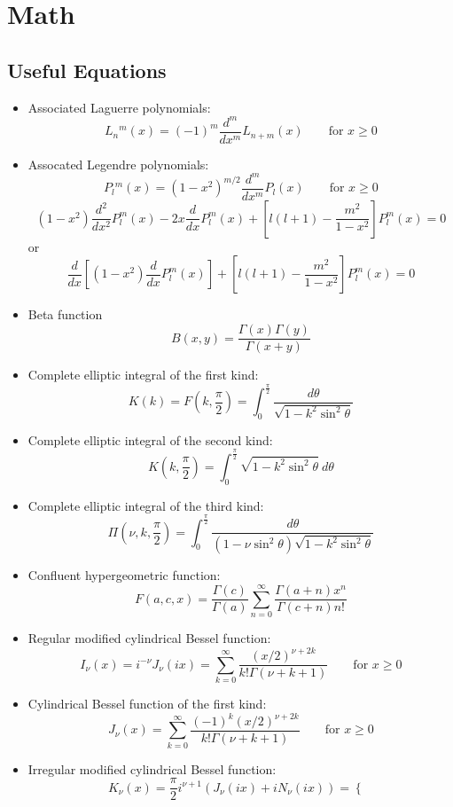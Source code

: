 \chapter{Math}

\section{Useful Equations}
\begin{itemize}
    \item Associated Laguerre polynomials:
	$$ L_n{}^m(x) = (-1)^m\frac{d^m}{dx^m}L_{n+m}(x) \qquad \text{for } x \ge 0$$
    \item Assocated Legendre polynomials:
	$$ P_l{}^m(x) = (1-x^2)^{m/2}\frac{d^m}{dx^m}P_{l}(x) \qquad \text{for } x \ge 0$$
	$$ (1-x^2)\frac{d^2}{dx^2}P_l^m(x) - 2x\frac{d}{dx}P_l^m(x) + 
	\left[ l(l+1) - \frac{m^2}{1-x^2} \right] P_l^m(x) = 0 $$
	or
	$$ \frac{d}{dx}\left[(1-x^2)\frac{d}{dx}P_l^m(x) \right] + 
	\left[ l(l+1) - \frac{m^2}{1-x^2} \right] P_l^m(x) = 0 $$
    \item Beta function
	$$ B(x,y) = \frac{\Gamma(x)\Gamma(y)}{\Gamma(x+y)} $$
    \item Complete elliptic integral of the first kind:
	$$ K(k) = F(k,\frac{\pi}{2}) = \int_0^{\frac{\pi}{2}}\frac{d\theta}{\sqrt{1-k^2\sin^2\theta}}$$
    \item Complete elliptic integral of the second kind:
	$$ K(k,\frac{\pi}{2}) = \int_0^{\frac{\pi}{2}}\sqrt{1-k^2\sin^2\theta}\ d\theta$$
    \item Complete elliptic integral of the third kind:
	$$ \Pi(\nu,k,\frac{\pi}{2}) = \int_0^{\frac{\pi}{2}}\frac{d\theta}{(1-\nu\sin^2\theta)\sqrt{1-k^2\sin^2\theta}}$$
    \item Confluent hypergeometric function:
	$$ F(a,c,x)= \frac{\Gamma(c)}{\Gamma(a)}\sum_{n=0}^\infty\frac{\Gamma(a+n)x^n}{\Gamma(c+n)n!}$$
    \item Regular modified cylindrical Bessel function:
	$$ I_\nu(x) = i^{-\nu} J_\nu(ix) = \sum_{k=0}^{\infty}\frac{(x/2)^{\nu+2k}}{k!\Gamma(\nu+k+1)} \qquad \text{for } x \ge 0$$
    \item Cylindrical Bessel function of the first kind:
	$$ J_\nu(x) = \sum_{k=0}^{\infty}\frac{(-1)^k(x/2)^{\nu+2k}}{k!\Gamma(\nu+k+1)} \qquad \text{for } x \ge 0$$
    \item Irregular modified cylindrical Bessel function: 
	$$ K_\nu(x) = \frac{\pi}{2}i^{\nu+1}(J_\nu(ix) + iN_\nu(ix)) = 
	    \begin{cases}

\end{cases}$$
\end{itemize}
